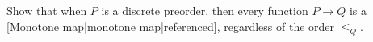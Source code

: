 

Show that when $P$ is a discrete preorder, then every function $P \rightarrow Q$ is a \ref{Monotone map|monotone map|referenced}, regardless of the order $\leq_Q$.
